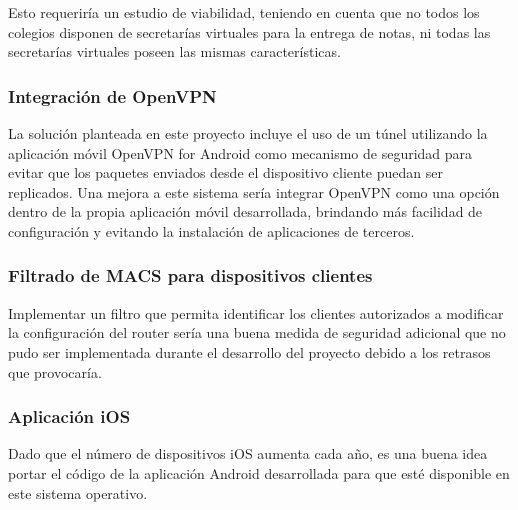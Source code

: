 \documentclass[12pt, twoside]{article}
\begin{document}
        Esto requeriría un estudio de viabilidad, teniendo en cuenta que no todos los colegios disponen de secretarías virtuales para la entrega de notas, ni todas las secretarías virtuales poseen las mismas características.

        \subsubsection{Integración de OpenVPN}
        La solución planteada en este proyecto incluye el uso de un túnel utilizando la aplicación móvil OpenVPN for Android como mecanismo de seguridad para evitar que los paquetes enviados desde el dispositivo cliente puedan ser replicados. Una mejora a este sistema sería integrar OpenVPN como una opción dentro de la propia aplicación móvil desarrollada, brindando más facilidad de configuración y evitando la instalación de aplicaciones de terceros.

        \subsubsection{Filtrado de MACS para dispositivos clientes}
        Implementar un filtro que permita identificar los clientes autorizados a modificar la configuración del router sería una buena medida de seguridad adicional que no pudo ser implementada durante el desarrollo del proyecto debido a los retrasos que provocaría.

        \subsubsection{Aplicación iOS}
        Dado que el número de dispositivos iOS aumenta cada año, es una buena idea portar el código de la aplicación Android desarrollada para que esté disponible en este sistema operativo.


\cleardoublepage









\end{document}
